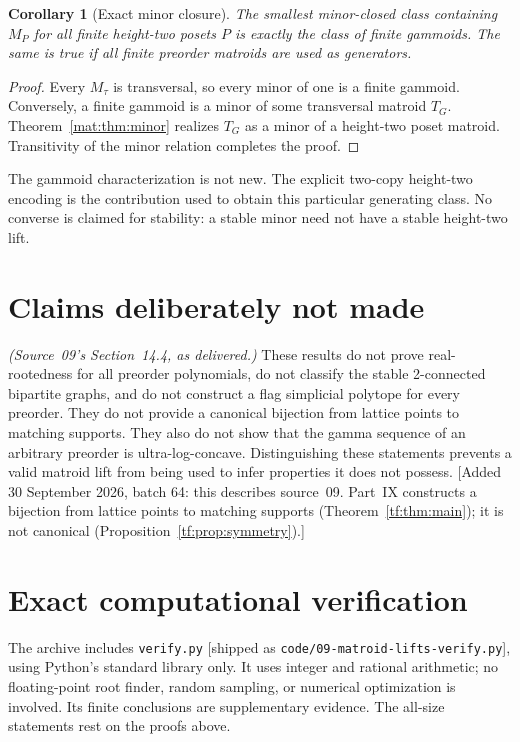 \documentclass[11pt]{article}
\numberwithin{equation}{section}
\newtheorem{corollary}[theorem]{Corollary}
\theoremstyle{definition}
\begin{document}
\begin{corollary}[Exact minor closure]\label{mat:cor:gammoids}
The smallest minor-closed class containing $M_P$ for all finite height-two
posets $P$ is exactly the class of finite gammoids. The same is true if all
finite preorder matroids are used as generators.
\end{corollary}
\begin{proof}
Every $M_\tau$ is transversal, so every minor of one is a finite gammoid.
Conversely, a finite gammoid is a minor of some transversal matroid $T_G$.
Theorem~\ref{mat:thm:minor} realizes $T_G$ as a minor of a height-two poset
matroid. Transitivity of the minor relation completes the proof.
\end{proof}

The gammoid characterization is not new. The explicit two-copy height-two
encoding is the contribution used to obtain this particular generating
class. No converse is claimed for stability: a stable minor need not have
a stable height-two lift.

\section{Claims deliberately not made}
\label{mat:sec:nonclaims}
\noindent\emph{(Source~09's Section~14.4, as delivered.)}
These results do not prove real-rootedness for all preorder polynomials,
do not classify the stable 2-connected bipartite graphs, and do not
construct a flag simplicial polytope for every preorder. They do not
provide a canonical bijection from lattice points to matching supports.
They also do not show that the gamma sequence of an arbitrary preorder is
ultra-log-concave. Distinguishing these statements prevents a valid
matroid lift from being used to infer properties it does not possess.
[Added 30 September 2026, batch 64: this describes source~09. Part~IX
constructs a bijection from lattice points to matching supports
(Theorem~\ref{tf:thm:main}); it is not canonical
(Proposition~\ref{tf:prop:symmetry}).]

\section{Exact computational verification}
\label{mat:sec:verification}
The archive includes \texttt{verify.py} [shipped as
\nolinkurl{code/09-matroid-lifts-verify.py}], using Python's standard library
only. It uses integer and rational arithmetic; no floating-point root
finder, random sampling, or numerical optimization is involved. Its
finite conclusions are supplementary evidence. The all-size statements
rest on the proofs above.
\end{document}
